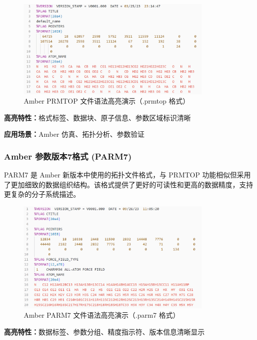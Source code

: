 \begin{figure}[!h]
    \centering
    \includegraphics[width=0.85\textwidth]{../images/prmtop.png}
    \caption{Amber PRMTOP 文件语法高亮演示（.prmtop 格式）}
    \label{fig:prmtop-highlighting}
\end{figure}

\textbf{高亮特性：}格式标签、数据块、原子信息、参数区域标识清晰

\textbf{应用场景：}Amber 仿真、拓扑分析、参数验证

\subsubsection{Amber 参数版本7格式 (PARM7)}

PARM7 是 Amber 新版本中使用的拓扑文件格式，与 PRMTOP 功能相似但采用了更加细致的数据组织结构。该格式提供了更好的可读性和更高的数据精度，支持更复杂的分子系统描述。

\begin{figure}[!h]
    \centering
    \includegraphics[width=0.85\textwidth]{../images/parm7.png}
    \caption{Amber PARM7 文件语法高亮演示（.parm7 格式）}
    \label{fig:parm7-highlighting}
\end{figure}

\textbf{高亮特性：}数据标签、参数分组、精度指示符、版本信息清晰显示

